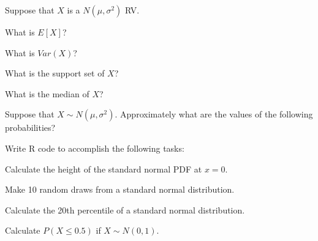 \documentclass[addpoints,12pt]{exam}
\begin{document}
\begin{questions}





\question Suppose that $X$ is a $N(\mu, \sigma^2)$ RV. 
\begin{parts}
\item What is $E[X]$?
\item What is $Var(X)$?
\item What is the support set of $X$?
\item What is the median of $X$?
\end{parts}

\question Suppose that $X \sim N(\mu, \sigma^2)$. Approximately what are the values of the following probabilities?

\question Write R code to accomplish the following tasks:
\begin{parts}
 \item Calculate the height of the standard normal PDF at $x = 0$.
 \item Make 10 random draws from a standard normal distribution.
 \item Calculate the 20th percentile of a standard normal distribution.
  \item Calculate $P(X \leq 0.5)$ if $X \sim N(0,1)$.
\end{parts}


\end{questions}
\end{document}
